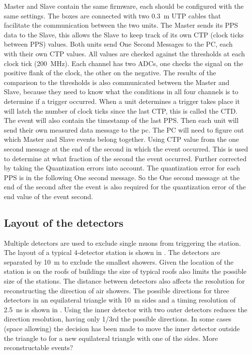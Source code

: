 Master and Slave contain the same firmware, each should be configured
with the same settings. The boxes are connected with two
\SI{0.3}{\meter} UTP cables that facilitate the communication between
the two units. The Master sends its PPS data to the Slave, this allows
the Slave to keep track of its own CTP (clock ticks between PPS) values.
Both units send One Second Messages to the PC, each with their own CTP
values. All \adc values are checked against the thresholds at each clock
tick (\SI{200}{\mega\hertz}). Each channel has two ADCs, one checks the
signal on the positive flank of the clock, the other on the negative.
The results of the comparison to the thresholds is also communicated
between the Master and Slave, because they need to know what the
conditions in all four channels is to determine if a trigger occurred.
When a unit determines a trigger takes place it will latch the number of
clock ticks since the last CTP, this is called the CTD. The event will
also contain the timestamp of the last PPS. Then each unit will send
their own measured data message to the pc. The PC will need to figure
out which Master and Slave events belong together. Using CTP value from
the one second message at the end of the second in which the event
occurred. This is used to determine at what fraction of the second the
event occurred. Further corrected by taking the Quantization errors into
account. The quantization error for each PPS is in the following One
second message. So the One second message at the end of the second after
the event is also required for the quantization error of the end value
of the event second.


\subsection{Layout of the detectors}

Multiple detectors are used to exclude single muons from triggering the station. The layout of a  typical 4-detector station is shown in . The detectors are separated by \SI{10}{\meter} to exclude the smallest showers. Given the location of the station is on the roofs of buildings the size of typical roofs also limits the possible size of the stations. The distance between detectors also affects the resolution for reconstructing the direction of air showers. The possible directions for three detectors in an equilateral triangle with \SI{10}{\meter} sides and a timing resolution of \SI{2.5}{\nano\second} is shown in . Using the inner detector with two outer detectors reduces the direction resolution, having only 1/3rd the possible directions. In some cases (space allowing) the decision has been made to move the inner detector outside the triangle to for a new equilateral triangle with one of the sides. More reconstructable events?

